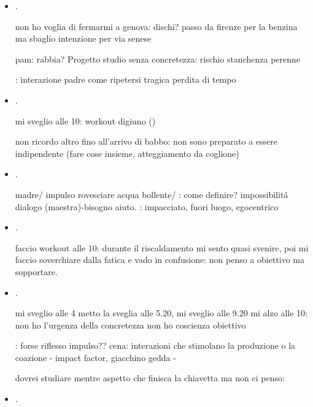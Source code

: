 \begin{itemize}
\item {}.

non ho voglia di fermarmi a genova: dischi? passo da firenze per la benzina ma sbaglio intenzione per via senese

pam: rabbia? Progetto studio senza concretezza: rischio stanchenza perenne

: interazione padre come ripetersi tragica perdita di tempo

\item {}.

mi sveglio alle 10: workout digiuno ()

non ricordo altro fino all'arrivo di babbo: non sono preparato a essere indipendente (fare cose insieme, atteggiamento da coglione)

\item {}.

madre/ impulso rovesciare acqua bollente/ : come definire? impossibilit\'a dialogo (maestra)-bisogno aiuto. : impacciato, fuori luogo, egocentrico

\item {}.

faccio workout alle 10: durante il riscaldamento mi sento quasi svenire, poi mi faccio soverchiare dalla fatica e vado in confusione: non penso a obiettivo ma sopportare.

\item {}.

mi sveglio alle 4 metto la sveglia alle 5.20, mi sveglio alle 9.20 mi alzo alle 10: non ho l'urgenza della concretezza non ho coscienza obiettivo

: forse riflesso impulso??
cena: interazioni che stimolano la produzione o la coazione - impact factor, giacchino gedda - 


dovrei studiare mentre aspetto che finisca la chiavetta ma non ci penso: 

\item {}.


\end{itemize}
